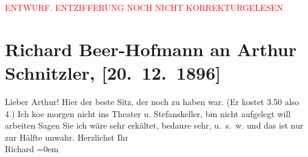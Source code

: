 
\begin{center}
            \textcolor{red}{ENTWURF. ENTZIFFERUNG NOCH NICHT KORREKTURGELESEN}
                      \end{center}
            
               \section[Richard Beer-Hofmann an Arthur Schnitzler, {[}20. 12. 1896{]}]{ Richard Beer-Hofmann an Arthur Schnitzler, {[}20. 12. 1896{]}}\nopagebreak{}\rehead{ }\begin{ledgroupsized}[t]{13cm}\normalsize\beginnumbering{} \toendnotes[C]{\smallbreak\pagebreak[2]} 
\pstart
           \noindent{}{\pb}Lieber Arthur!
               Hier der beste Sitz, der noch zu haben war. (Er kostet 3.50 also 4.) Ich
                  ko{\geminationm}e morgen nicht \introOben{}ins Theater u.
                     Stefanskeller\introOben{}, bin nicht aufgelegt will
               arbeiten\pend
           \pstart
           Sagen Sie ich wäre sehr erkältet, bedaure sehr, u. s. w. und {\pb}das ist nur zur Hälfte unwahr.\pend
           \pstart
           Herzlichst Ihr {\\[\baselineskip]}\spacefill\mbox{Richard}\pend
           \leftskip=0em{}\endnumbering{}\end{ledgroupsized}  \newcommand{\dateiname}{L00631}\newcommand{\titel}{Richard Beer-Hofmann an Arthur Schnitzler, [20. 12. 1896]}\newcommand{\editorInnen}{Martin Anton Müller und Gerd-Hermann Susen}
      
